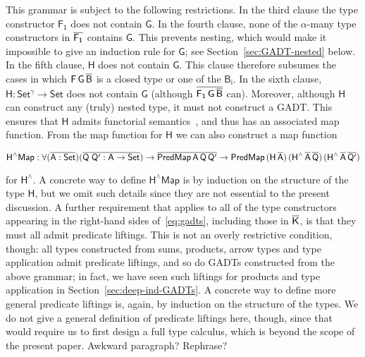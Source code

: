 \documentclass[9pt]{entcs}
\begin{document}
\pagebreak

\noindent
This grammar is subject to the following restrictions. In the third
clause the type constructor $\mathsf{F_1}$ does not contain
$\mathsf{G}$. In the fourth clause, none of the $\mathsf{\alpha}$-many
type constructors in $\mathsf{\overline{F_1}}$ contains $\mathsf{G}$.  This
prevents nesting, which would make it impossible to give an induction
rule for $\mathsf{G}$; see Section~\ref{sec:GADT-nested} below. In the
fifth clause, $\mathsf{H}$ does not contain $\mathsf{G}$. This clause
therefore subsumes the cases in which $\mathsf{F\,G\,\overline{B}}$ is a
closed type or one of the $\mathsf{B_i}$. In the sixth clause,
$\mathsf{H : Set^\gamma \to Set}$ does not contain $\mathsf{G}$
(although $\overline{\mathsf{F_1\,G\,\overline{B}}}$ can). Moreover, although
$\mathsf{H}$ can construct any (truly) nested type, it must not
construct a GADT. This ensures that $\mathsf{H}$ admits functorial
semantics~\cite{jp20}, and thus has an associated map function. From
the map function for $\mathsf{H}$ we can also construct a map function

\vspace*{-0.05in}

\begin{equation}\label{eq:hliftmap}
\mathsf{H^\wedge Map : \forall (\overline{A : Set}) (\overline{Q\;Q' : A \to Set}) 
\to \overline{PredMap\,A\,Q\,Q'} \to
PredMap\,(H\,\overline{A})\,(H^{\wedge}\,\overline{A}\,\overline{Q})\, 
(H^{\wedge}\,\overline{A}\,\overline{Q'})}
\end{equation}

\vspace*{0.05in}

\noindent
for $\mathsf{H^{\wedge}}$. A concrete way to define $\mathsf{H^\wedge
  Map}$ is by induction on the structure of the type $\mathsf{H}$, but
we omit such details since they are not essential to the present
discussion. A further requirement that applies to all of the type
constructors appearing in the right-hand sides of~\eqref{eq:gadts},
including those in $\overline{\mathsf{K}}$, is that they must all admit
predicate liftings. This is not an overly restrictive condition,
though: all types constructed from sums, products, arrow types and
type application admit predicate liftings, and so do GADTs constructed
from the above grammar; in fact, we have seen such liftings for
products and type application in Section~\ref{sec:deep-ind-GADTs}. A
concrete way to define more general predicate liftings is, again, by
induction on the structure of the types. We do not give a general
definition of predicate liftings here, though, since that would
require us to first design a full type calculus, which is beyond the
scope of the present paper. {\color{red} Awkward paragraph? Rephrase?}
\end{document}
